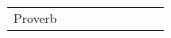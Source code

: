 \begin{table}
\begin{tabular}{lrrrrrrrr}
        Proverb                                                                                                                                                                                                                                                                                                                                                                                                                                                                                                                                                                                                                                                                                                                                                                                                                                                                                                                                                                                                                                                                                                                                                                                                                                                                                                                                                                                                                                                                                                                                                                                                                                                                                                                                                                                                                                                                                                                                                                                                                                                                                                                                                                                                                                                                                                                                                                                                                                                                                                                                                                                                                                                                                                                                                                                                                                                                                                                                                                                                                                                                                                                                                                                                                                                                                                                                                                                                                
\end{tabular}
\end{table}
